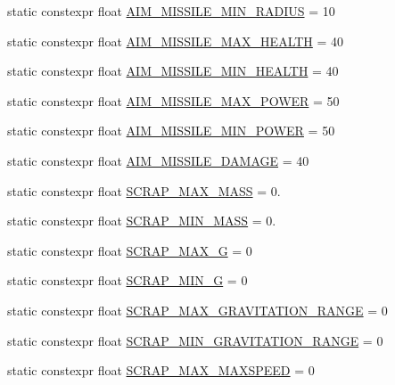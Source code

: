 \begin{DoxyCompactItemize}
\item 
static constexpr float \hyperlink{class_act_conf_a449ba6616f4daa21eac25801f7093c0c}{A\+I\+M\+\_\+\+M\+I\+S\+S\+I\+L\+E\+\_\+\+M\+I\+N\+\_\+\+R\+A\+D\+I\+U\+S} = 10
\item 
static constexpr float \hyperlink{class_act_conf_a9494c0ec322512e98bc9f5342c2ede69}{A\+I\+M\+\_\+\+M\+I\+S\+S\+I\+L\+E\+\_\+\+M\+A\+X\+\_\+\+H\+E\+A\+L\+T\+H} = 40
\item 
static constexpr float \hyperlink{class_act_conf_a6d5b2b58fdfe561f358d8621116bb8da}{A\+I\+M\+\_\+\+M\+I\+S\+S\+I\+L\+E\+\_\+\+M\+I\+N\+\_\+\+H\+E\+A\+L\+T\+H} = 40
\item 
static constexpr float \hyperlink{class_act_conf_a58408beb17f88eaa7bb0c325be55d93d}{A\+I\+M\+\_\+\+M\+I\+S\+S\+I\+L\+E\+\_\+\+M\+A\+X\+\_\+\+P\+O\+W\+E\+R} = 50
\item 
static constexpr float \hyperlink{class_act_conf_a966fde5475ede8298c78d4f7479689f2}{A\+I\+M\+\_\+\+M\+I\+S\+S\+I\+L\+E\+\_\+\+M\+I\+N\+\_\+\+P\+O\+W\+E\+R} = 50
\item 
static constexpr float \hyperlink{class_act_conf_ab5b9504a164684a3184baa14ca2ff23f}{A\+I\+M\+\_\+\+M\+I\+S\+S\+I\+L\+E\+\_\+\+D\+A\+M\+A\+G\+E} = 40
\item 
static constexpr float \hyperlink{class_act_conf_a7ca908964208c27ea40962fda8eb951e}{S\+C\+R\+A\+P\+\_\+\+M\+A\+X\+\_\+\+M\+A\+S\+S} = 0.
\item 
static constexpr float \hyperlink{class_act_conf_a29e1e2d930866f1f2e8ed704fef9f9fa}{S\+C\+R\+A\+P\+\_\+\+M\+I\+N\+\_\+\+M\+A\+S\+S} = 0.
\item 
static constexpr float \hyperlink{class_act_conf_a1b9bf891b49592f6021e7b960c8b5a42}{S\+C\+R\+A\+P\+\_\+\+M\+A\+X\+\_\+\+G} = 0
\item 
static constexpr float \hyperlink{class_act_conf_aecb30bfc7bb1532ca26587a0d5b444dd}{S\+C\+R\+A\+P\+\_\+\+M\+I\+N\+\_\+\+G} = 0
\item 
static constexpr float \hyperlink{class_act_conf_af5662a75e1870b58983d804a10a9785d}{S\+C\+R\+A\+P\+\_\+\+M\+A\+X\+\_\+\+G\+R\+A\+V\+I\+T\+A\+T\+I\+O\+N\+\_\+\+R\+A\+N\+G\+E} = 0
\item 
static constexpr float \hyperlink{class_act_conf_a48a1ab9d0a01057a576a75c0ef9bffe1}{S\+C\+R\+A\+P\+\_\+\+M\+I\+N\+\_\+\+G\+R\+A\+V\+I\+T\+A\+T\+I\+O\+N\+\_\+\+R\+A\+N\+G\+E} = 0
\item 
static constexpr float \hyperlink{class_act_conf_abd5b4bb7fc133a5d7958ffdec5665530}{S\+C\+R\+A\+P\+\_\+\+M\+A\+X\+\_\+\+M\+A\+X\+S\+P\+E\+E\+D} = 0

\end{DoxyCompactItemize}
